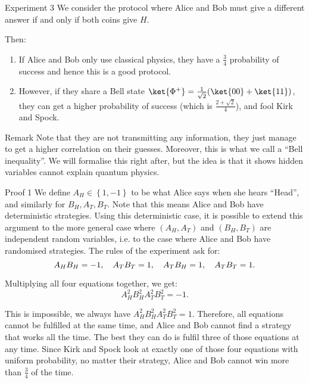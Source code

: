 \documentclass[a4paper]{article}
\begin{document}
\begin{parag}{Experiment 3}
    We consider the protocol where Alice and Bob must give a different answer if and only if both coins give $H$.

    Then:
    \begin{enumerate}
        \item If Alice and Bob only use classical physics, they have a $\frac{3}{4}$ probability of success and hence this is a good protocol.
        \item However, if they share a Bell state $\ket{\Phi^+} = \frac{1}{\sqrt{2}}\left(\ket{00} + \ket{11}\right)$, they can get a higher probability of success (which is $\frac{2 + \sqrt{2}}{4}$), and fool Kirk and Spock.
    \end{enumerate}

    \begin{subparag}{Remark}
        Note that they are not transmitting any information, they just manage to get a higher correlation on their guesses. Moreover, this is what we call a ``Bell inequality''. We will formalise this right after, but the idea is that it shows hidden variables cannot explain quantum physics.
    \end{subparag}
    
    \begin{subparag}{Proof 1}
        We define $A_H \in \left\{1, -1\right\}$ to be what Alice says when she hears ``Head'', and similarly for $B_H, A_T, B_T$. Note that this means Alice and Bob have deterministic strategies. Using this deterministic case, it is possible to extend this argument to the more general case where $\left(A_H, A_T\right)$ and $\left(B_H, B_T\right)$ are independent random variables, i.e. to the case where Alice and Bob have randomised strategies. The rules of the experiment ask for: 
        \[A_H B_H = -1, \quad A_T B_T = 1, \quad A_T B_H = 1, \quad A_T B_T = 1.\]

        Multiplying all four equations together, we get: 
        \[A_H^2 B_H^2 A_T^2 B_T^2 = -1.\]

        This is impossible, we always have $A_H^2 B_H^2 A_T^2 B_T^2 = 1$. Therefore, all equations cannot be fulfilled at the same time, and Alice and Bob cannot find a strategy that works all the time. The best they can do is fulfil three of those equations at any time. Since Kirk and Spock look at exactly one of those four equations with uniform probability, no matter their strategy, Alice and Bob cannot win more than $\frac{3}{4}$ of the time.
    \end{subparag}


\end{parag}
\end{document}
